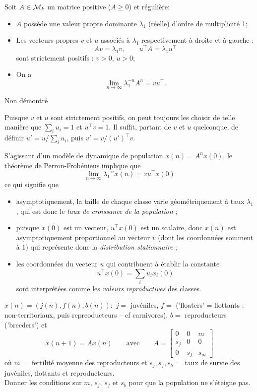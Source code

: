 \begin{theorem}
  Soit $A \in \mathcal{M}_k$ un matrice positive ($A \geq 0$) et régulière:
  \begin{itemize}
    \item $A$ possède une valeur propre dominante $\lambda_1$ (réelle) d'ordre de multiplicité 1;
    \item Les vecteurs propres $v$ et $u$ associés à $\lambda_1$ respectivement à droite et à gauche : 
    $$
    A v = \lambda_1 v, \qquad u^\top A = \lambda_1 u^\top
    $$
    sont strictement positifs : $v > 0$, $u > 0$;
    \item On a 
    $$
    \lim_{n \to \infty} \lambda_1^{-n} A^n = v u^\top.
    $$
  \end{itemize}
\end{theorem}

\proof
Non démontré
\eproof

\remark
Puisque $v$ et $u$ sont strictement positifs, on peut toujours les choisir de telle manière que $\sum_i u_i = 1$ et $u^\top v = 1$. Il suffit, partant de $v$ et $u$ quelconque, de définir $u' = u / \sum_i u_i$, puis $v' = v / (u')^\top v$.

\remark
S'agissant d'un modèle de dynamique de population $x(n) = A^n x(0)$, le théorème de Perron-Frobénieus implique que 
$$
\lim_{n \to \infty} \lambda_1^{-n} x(n) = v u^\top x(0)
$$
ce qui signifie que
\begin{itemize}
 \item asymptotiquement, la taille de chaque classe varie géométriquement à taux $\lambda_1$, qui est donc le {\em taux de croissance de la population} ; 
 \item puisque $x(0)$ est un vecteur, $u^\top x(0)$ est un scalaire, donc $x(n)$ est asymptotiquement proportionnel au vecteur $v$ (dont les coordonnées somment à 1) qui représente donc la {\em distribution stationnaire} ;
 \item les coordonnées du vecteur $u$ qui contribuent à établir la constante 
 $$
 u^\top x(0) = \sum_i u_i x_i(0)
 $$
 sont interprétées comme les {\em valeurs reproductives} des classes.
\end{itemize}



\begin{exercise*}
  $x(n) = (j(n), f(n), b(n)) :$ $j =$ juvéniles, $f = $ ('floaters' = flottants : non-territoriaux, puis repreoducteurs -- cf carnivores), $b = $ reproducteurs ('breeders') et
  $$
  x(n+1) = A x(n) 
  \qquad \text{avec} \qquad
  A = \left[\begin{array}{ccc} 0 & 0 & m \\ s_j & 0 & 0 \\ 0 & s_f & s_m \end{array}\right]
  $$
  où $m =$ fertilité moyenne des reproducteurs et $s_j, s_f, s_b =$ taux de survie des juvéniles, flottants et reproducteurs. \\
  Donner les conditions sur $m$, $s_j$, $s_f$ et $s_b$ pour que la population ne s'éteigne pas.
\end{exercise*}


